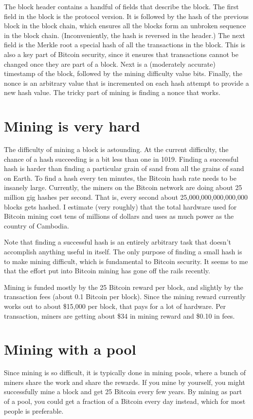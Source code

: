 The block header contains a handful of fields that describe the block. The first field in the block is the protocol version. It is followed by the hash of the previous block in the block chain, which ensures all the blocks form an unbroken sequence in the block chain. (Inconveniently, the hash is reversed in the header.) The next field is the Merkle root a special hash of all the transactions in the block. This is also a key part of Bitcoin security, since it ensures that transactions cannot be changed once they are part of a block. Next is a (moderately accurate) timestamp of the block, followed by the mining difficulty value bits.  Finally, the nonce is an arbitrary value that is incremented on each hash attempt to provide a new hash value. The tricky part of mining is finding a nonce that works.

\section{Mining is very hard}
The difficulty of mining a block is astounding. At the current difficulty, the chance of a hash succeeding is a bit less than one in 1019. Finding a successful hash is harder than finding a particular grain of sand from all the grains of sand on Earth. To find a hash every ten minutes, the Bitcoin hash rate needs to be insanely large. Currently, the miners on the Bitcoin network are doing about 25 million gig hashes per second. That is, every second about 25,000,000,000,000,000 blocks gets hashed. I estimate (very roughly) that the total hardware used for Bitcoin mining cost tens of millions of dollars and uses as much power as the country of Cambodia.

Note that finding a successful hash is an entirely arbitrary task that doesn't accomplish anything useful in itself. The only purpose of finding a small hash is to make mining difficult, which is fundamental to Bitcoin security. It seems to me that the effort put into Bitcoin mining has gone off the rails recently.

Mining is funded mostly by the 25 Bitcoin reward per block, and slightly by the transaction fees (about 0.1 Bitcoin per block). Since the mining reward currently works out to about \$15,000 per block, that pays for a lot of hardware. Per transaction, miners are getting about \$34 in mining reward and \$0.10 in fees.

\section{Mining with a pool}
Since mining is so difficult, it is typically done in mining pools, where a bunch of miners share the work and share the rewards. If you mine by yourself, you might successfully mine a block and get 25 Bitcoin every few years. By mining as part of a pool, you could get a fraction of a Bitcoin every day instead, which for most people is preferable.

